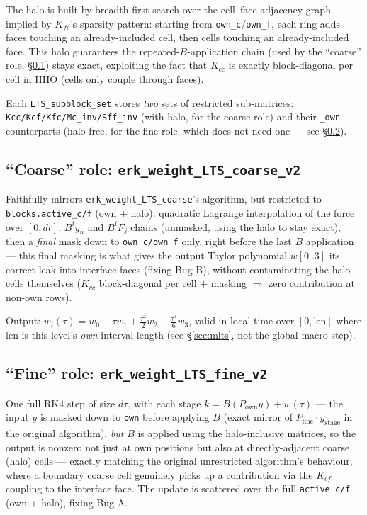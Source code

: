 \documentclass[11pt]{article}
\newcommand{\code}[1]{\texttt{#1}}
\begin{document}
The halo is built by breadth-first search over the cell--face adjacency
graph implied by $K_{fc}$'s sparsity pattern: starting from
\code{own\_c}/\code{own\_f}, each ring adds faces touching an
already-included cell, then cells touching an already-included face.
This halo guarantees the repeated-$B$-application chain (used by the
``coarse'' role, \S\ref{sec:coarse}) stays exact, exploiting the fact
that $K_{cc}$ is exactly block-diagonal per cell in HHO (cells only
couple through faces).

Each \code{LTS\_subblock\_set} stores \emph{two} sets of restricted
sub-matrices: \code{Kcc/Kcf/Kfc/Mc\_inv/Sff\_inv} (with halo, for the
coarse role) and their \code{\_own} counterparts (halo-free, for the fine
role, which does not need one --- see \S\ref{sec:fine}).

\subsection{``Coarse'' role: \code{erk\_weight\_LTS\_coarse\_v2}}
\label{sec:coarse}

Faithfully mirrors \code{erk\_weight\_LTS\_coarse}'s algorithm, but
restricted to \code{blocks.active\_c/f} (own + halo): quadratic Lagrange
interpolation of the force over $[0,dt]$, $B^i y_n$ and $B^i F_j$ chains
(unmasked, using the halo to stay exact), then a \emph{final} mask down
to \code{own\_c/own\_f} only, right before the last $B$ application ---
this final masking is what gives the output Taylor polynomial $w[0..3]$
its correct leak into interface faces (fixing Bug B), without
contaminating the halo cells themselves ($K_{cc}$ block-diagonal per cell
+ masking $\Rightarrow$ zero contribution at non-own rows).

Output: $w_i(\tau) = w_0 + \tau w_1 + \tfrac{\tau^2}{2} w_2 +
\tfrac{\tau^3}{6} w_3$, valid in local time over $[0, \mathrm{len}]$
where $\mathrm{len}$ is this level's \emph{own} interval length (see
\S\ref{sec:mlts}, not the global macro-step).

\subsection{``Fine'' role: \code{erk\_weight\_LTS\_fine\_v2}}
\label{sec:fine}

One full RK4 step of size $d\tau$, with each stage
$k = B(P_{\text{own}} y) + w(\tau)$ --- the input $y$ is masked down to
\code{own} before applying $B$ (exact mirror of $P_{\text{fine}} \cdot
y_{\text{stage}}$ in the original algorithm), \emph{but} $B$ is applied
using the halo-inclusive matrices, so the output is nonzero not just at
own positions but also at directly-adjacent coarse (halo) cells ---
exactly matching the original unrestricted algorithm's behaviour, where
a boundary coarse cell genuinely picks up a contribution via the $K_{cf}$
coupling to the interface face. The update is scattered over the full
\code{active\_c/f} (own + halo), fixing Bug A.
\end{document}
